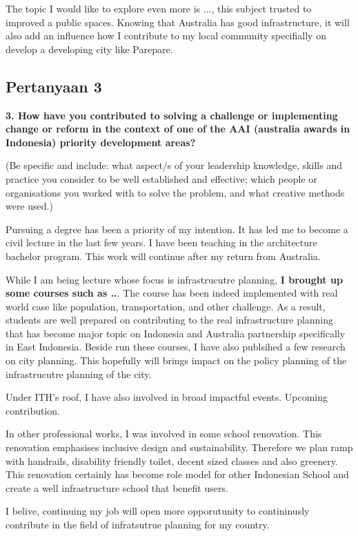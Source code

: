 \documentclass[../main.tex]{subfiles}
\begin{document}
The topic I would like to explore even more is ..., this subject trusted to improved a public spaces.
Knowing that Australia has good infrastructure, it will also add an influence how I contribute to my local community specifially on develop a developing city like Parepare.

\subsection*{Pertanyaan 3}%
\label{sub:Pertanyaan 3}

\textbf{3. How have you contributed to solving a challenge or implementing change or reform in the context of one of the AAI (australia awards in Indonesia) priority development areas?}

(Be specific and include: what aspect/s of your leadership knowledge, skills and practice you consider
to be well established and effective; which people or organisations you worked with to solve the problem,
and what creative methods were used.)

Pursuing a degree has been a priority of my intention. It has led me to become a civil lecture in the last few years.
I have been teaching in the architecture bachelor program.
This work will continue after my return from Australia.

While I am being lecture whose focus is infrastrucutre planning, \textbf{I brought up some courses such as ..}.
The course has been indeed implemented with real world case like population, transportation, and other challenge.
As a result, students are well prepared on contributing to the real infrastructure planning that has become major topic on Indonesia and Australia partnership specifically in East Indonesia.
Beside run these courses, I have also publsihed a few research on city planning. This hopefully will brings impact on the policy planning of the infrastrucutre planning of the city.

Under ITH's roof, I have also involved in broad impactful events.
Upcoming contribution.

In other professional works, I was involved in some school renovation.
This renovation emphasises inclusive design and sustainability.
Therefore we plan ramp with handrails, disability friendly toilet, decent sized classes and also greenery.
This renovation certainly has become role model for other Indonesian School and create a well infrastructure school that benefit users.


I belive, continuing my job will open more opporutunity to contininusly contribute in the field of infratsutrue planning for my country.
\end{document}
